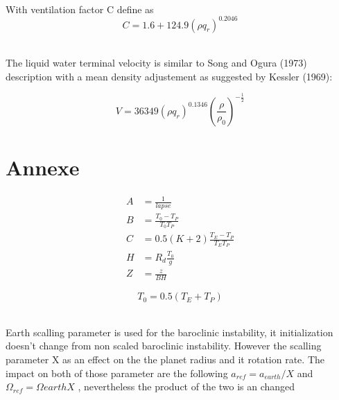 \documentclass[times,doublespace]{fldauth}
\begin{document}
~\\ With ventilation factor C define as 
\begin{equation}
C=1.6+124.9(\rho q_r)^{0.2046}
\label{venti}
\end{equation}



~\\ The liquid water terminal velocity is similar to Song and Ogura (1973) description with a mean density adjustement as suggested by Kessler (1969):

\begin{equation}
V=36349(\rho q_r)^{0.1346}\left(\frac{\rho}{\rho_0}\right)^{-\frac{1}{2}}
\end{equation}



\clearpage 
\appendix
\section{Annexe}

\begin{align*}
A&= \frac{1}{lapse} \\
B&=\frac{T_0-T_P}{T_0T_P} \\
C&=0.5(K+2) \frac{T_E-T_P}{T_ET_P} \\
H&=R_d\frac{T_0} {g}\\
Z&=\frac{z}{B H}  
\end{align*}


\begin{equation*}
T_0=0.5(T_E +T_P)
\end{equation*}

~\\Earth scalling parameter is used for the baroclinic instability, it initialization doesn't change from non scaled baroclinic instability. However the scalling parameter X as an effect on the the planet radius and it rotation rate. The impact on both of those parameter are the following $a_{ref}=a_{earth}/X$ and $\Omega_{ref}=\Omega{earth}X$ , nevertheless the product of the two is an changed 
\end{document}
